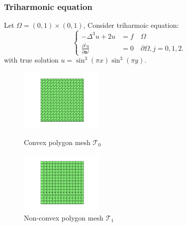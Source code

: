 \documentclass[notheorems,serif]{beamer}
\begin{document}
\begin{frame}
  \frametitle{Triharmonic equation}
  Let $\Omega = (0, 1)\times(0, 1)$, Consider triharmoic equation:
  $$
  \left\{
  \begin{aligned}
      -\Delta^3 u + 2u & = f \quad \Omega\\
      \frac{\partial^j u}{\partial \boldsymbol{n}^j} & = 0 \quad \partial\Omega,
      j = 0, 1, 2.
  \end{aligned}
  \right.
  $$
  with true solution $u = \sin^3(\pi x)\sin^3(\pi y)$.

\begin{figure}[htbp]
\centering
\begin{minipage}[t]{0.49\linewidth}
\centering
\includegraphics[width=4cm]{../figures/convex.pdf}
\caption{Convex polygon mesh $\mathcal T_0$}
\end{minipage}%
\begin{minipage}[t]{0.49\linewidth}
\centering
\includegraphics[width=4cm]{../figures/nonconvex.pdf}
\caption{Non-convex polygon mesh $\mathcal T_1$}
\end{minipage}%
\centering
\label{fig:mesh}
\end{figure}

\end{frame}
\end{document}
